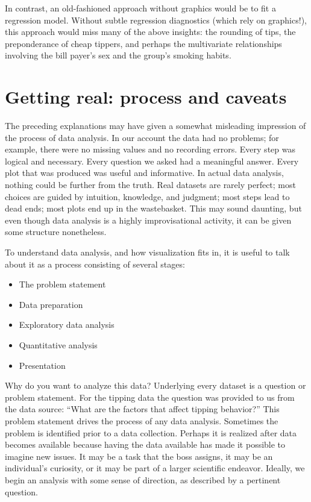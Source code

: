 In contrast, an old-fashioned approach without graphics would be to
fit a regression model.  Without subtle regression diagnostics
(which rely on graphics!), this approach would miss many of the above
insights: the rounding of tips, the preponderance of cheap tippers,
and perhaps the multivariate relationships involving the bill payer's
sex and the group's smoking habits.


\section{Getting real: process and caveats}


The preceding explanations may have given a somewhat misleading
impression of the process of data analysis.  In our account the data
had no problems; for example, there were no missing values and no
recording errors.  Every step was logical and necessary.  Every
question we asked had a meaningful answer.  Every plot that was
produced was useful and informative.  In actual data analysis, nothing
could be further from the truth.  Real datasets are rarely perfect;
most choices are guided by intuition, knowledge, and judgment; most
steps lead to dead ends; most plots end up in the wastebasket.  This
may sound daunting, but even though data analysis is a highly
improvisational activity, it can be given some structure nonetheless.


To understand data analysis, and how visualization fits in, it is
useful to talk about it as a process consisting of several stages:

\newpage
\begin{itemize}
\item The problem statement
\item Data preparation
\item Exploratory data analysis 
\item Quantitative analysis
\item Presentation
\end{itemize}

 Why do you want to analyze this
data?  Underlying every dataset is a question or problem statement.
For the tipping data the question was provided to us from the data
source: ``What are the factors that affect tipping behavior?'' This
problem statement drives the process of any data analysis. Sometimes
the problem is identified prior to a data collection. Perhaps it is
realized after data becomes available because having the data
available has made it possible to imagine new issues.  It may be a
task that the boss assigns, it may be an individual's curiosity, or it
may be part of a larger scientific endeavor.  Ideally, we begin an
analysis with some sense of direction, as described by a pertinent
question.

